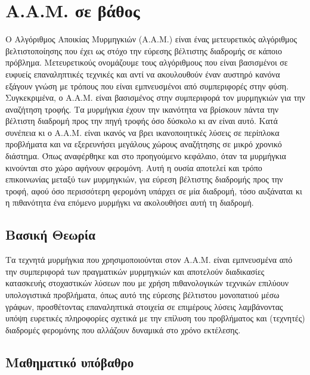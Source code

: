 \section{Α.Α.Μ. σε βάθος}
Ο Αλγόριθμος Αποικίας Μυρμηγκιών (Α.Α.Μ.) είναι ένας μετευρετικός αλγόριθμος βελτιστοποίησης που έχει ως στόχο την εύρεσης βέλτιστης διαδρομής σε κάποιο πρόβλημα. Μετευρετικούς ονομάζουμε τους αλγόριθμους που είναι βασισμένοι σε ευφυείς επαναληπτικές τεχνικές και αντί να ακουλουθούν έναν αυστηρό κανόνα εξάγουν γνώση με τρόπους που είναι εμπνευσμένοι από συμπεριφορές στην φύση. \cite{Maniezzo} Συγκεκριμένα, ο Α.Α.Μ. είναι βασισμένος στην συμπεριφορά τον μυρμηγκιών για την αναζήτηση τροφής. 
Τα μυρμήγκια έχουν την ικανότητα να βρίσκουν πάντα την βέλτιστη διαδρομή προς την πηγή τροφής όσο δύσκολο κι αν είναι αυτό. Κατά συνέπεια κι ο Α.Α.Μ. είναι ικανός να βρει ικανοποιητικές λύσεις σε περίπλοκα προβλήματα και να εξερευνήσει μεγάλους χώρους αναζήτησης σε μικρό χρονικό διάστημα. Όπως αναφέρθηκε και στο προηγούμενο κεφάλαιο, όταν τα μυρμήγκια κινούνται στο χώρο αφήνουν φερομόνη. Αυτή η ουσία αποτελεί και τρόπο επικοινωνίας μεταξύ των μυρμηγκιών, για εύρεση βέλτιστης διαδρομής προς την τροφή, αφού όσο περισσότερη φερομόνη υπάρχει σε μία διαδρομή, τόσο αυξάναται κι η πιθανότητα ένα επόμενο μυρμήγκι να ακολουθήσει αυτή τη διαδρομή. 

\subsection{Βασική Θεωρία}
Τα τεχνητά μυρμήγκια που χρησιμοποιούνται στον Α.Α.Μ. είναι εμπνευσμένα από την συμπεριφορά των πραγματικών μυρμηγκιών και αποτελούν διαδικασίες κατασκευής στοχαστικών λύσεων που με χρήση πιθανολογικών τεχνικών επιλύουν υπολογιστικά προβλήματα, όπως αυτό της εύρεσης βέλτιστου μονοπατιού μέσω γράφων, προσθέτοντας επαναληπτικά στοιχεία σε επιμέρους λύσεις λαμβάνοντας υπόψη ευρετικές πληροφορίες σχετικά με την επίλυση του προβλήματος και (τεχνητές) διαδρομές φερομόνης που αλλάζουν δυναμικά στο χρόνο εκτέλεσης. \cite{Dorigo-Stutzle}

\subsection{Μαθηματικό υπόβαθρο}


